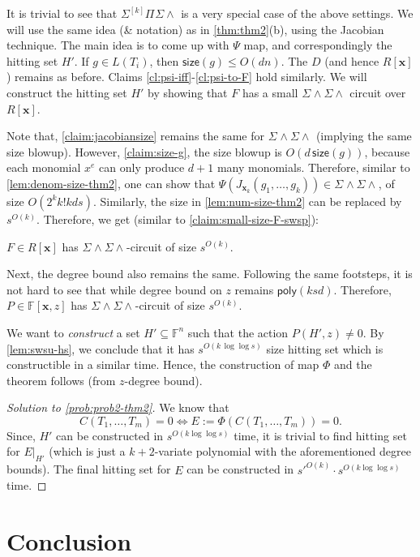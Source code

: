 \documentclass[10pt,a4paper]{article}
\newcommand{\poly}{\mathsf{poly}}
\newcommand{\F}{\mathbb{F}}
\newcommand{\x}{{\boldsymbol x}}
\newcommand{\size}{\mathsf{size}}
\newcommand{\SPSU}[3]{\Sigma^{#1} \Pi^{#2} \Sigma \wedge^{#3}}
\newcommand{\SWSU}[2]{\Sigma^{#1}\!\wedge\!\Sigma\!\wedge^{#2}}
\numberwithin{equation}{section}
\begin{document}
It is trivial to see that $\SPSU{[k]}{}{}$ is a very special case of the above settings. We will use the same idea (\& notation) as in \autoref{thm:thm2}(b), using the Jacobian technique. The main idea is to come up with $\Psi$ map, and correspondingly the hitting set $H'$. If $g \in L(T_i)$, then $\size(g) \le O(dn)$. 
%
The $D$ (and hence $R[\x]$) remains as before. Claims \ref{cl:psi-iff}-\ref{cl:psi-to-F} hold similarly. We will construct the hitting set $H'$ by showing that $F$ has a small $\SWSU{}{}{}$ circuit over $R[\x]$. 

Note that, \autoref{claim:jacobiansize} remains the same for $\SWSU{}{}{}$ (implying the same size blowup). However, \autoref{claim:size-g}, the size blowup is $O(d\,\size(g))$, because each monomial $x^e$ can only produce $d+1$ many monomials. Therefore, similar to \autoref{lem:denom-size-thm2}, one can show that $\Psi(J_{\x_k}(g_1,\hdots,g_k)) \in \SWSU{}{}{}$, of size $O(2^kk!kds)$. Similarly, the size in \autoref{lem:num-size-thm2} can be replaced by $s^{O(k)}$. Therefore, we get (similar to \autoref{claim:small-size-F-swsp}):

\begin{claim}
$F \in R[\x]$ has $\SWSU{}{}{}$-circuit of size $s^{O(k)}$.
\end{claim}

Next, the degree bound also remains the same. Following the same footsteps, it is not hard to see that 
%
while degree bound on $z$ remains $\poly(ksd)$. Therefore, $P \in \F[\x,z]$ has $\SWSU{}{}{}$-circuit of size $s^{O(k)}$.

We want to \emph{construct} a set $H' \subseteq \F^n$ such that the action $P(H',z) \ne 0$.  By \autoref{lem:swsu-hs}, we conclude that it has $s^{O(k\,\log \log s)}$ size hitting set  which is constructible in a similar time. Hence, the construction of map $\Phi$ and the theorem follows (from $z$-degree bound).


\begin{proof}[Solution to \autoref{prob:prob2-thm2}]
We know that \[C(T_1,\hdots,T_m) = 0 \iff E:= \Phi(C(T_1,\hdots,T_m)) =0.\] 
Since, $H'$ can be constructed in $s^{O(k \log \log s)}$ time, it is trivial to find hitting set for $E\rvert_{H'}$ (which is just a $k+2$-variate polynomial with the aforementioned degree bounds). The final hitting set for $E$ can be constructed in $s'^{O(k)} \cdot s^{O(k \log \log s)}$ time.
\end{proof}

\section{Conclusion}
\end{document}
